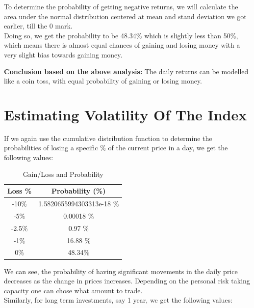 \documentclass[11pt]{article}
\begin{document}
To determine the probability of getting negative returns, we will calculate the area under the normal distribution centered at mean and stand deviation we got earlier, till the 0 mark.\\

Doing so, we get the probability to be 48.34\% which is slightly less than 50\%, which means there is almost equal chances of gaining and losing money with a very slight bias towards gaining money.\

\vspace{4mm}
\raggedright \textbf{Conclusion based on the above analysis:} The daily returns can be modelled like a coin toss, with equal probability of gaining or losing money.
\newpage

\section*{Estimating Volatility Of The Index} 
\vspace{8mm}
If we again use the cumulative distribution function to determine the probabilities of losing a specific \% of the current price in a day, we get the following values:

\begin{table}[ht]
  \centering
  \caption{Gain/Loss and Probability}
  \begin{tabular}{cc}
    \toprule
    \textbf{Loss \%} & \textbf{Probability (\%)} \\
    \midrule
    -10\% & 1.5820655994303313e-18 \% \\
    -5\% & 0.00018 \% \\
    -2.5\% & 0.97 \% \\
    -1\% & 16.88 \% \\
    0\% & 48.34\% \\
    \bottomrule
  \end{tabular}
\end{table}

We can see, the probability of having significant movements in the daily price decreases as the change in prices increases. Depending on the personal risk taking capacity one can chose what amount to trade.\\
\vspace{2.5mm}
Similarly, for long term investments, say 1 year, we get the following values:
\end{document}
